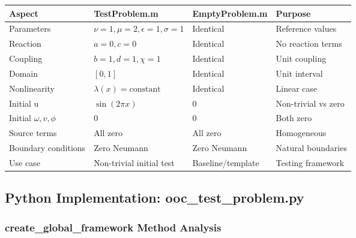 \begin{longtable}{|p{3cm}|p{4cm}|p{4cm}|p{2cm}|}
\hline
\textbf{Aspect} & \textbf{TestProblem.m} & \textbf{EmptyProblem.m} & \textbf{Purpose} \\
\hline
\endhead

Parameters & $\nu=1, \mu=2, \epsilon=1, \sigma=1$ & Identical & Reference values \\
\hline

Reaction & $a=0, c=0$ & Identical & No reaction terms \\
\hline

Coupling & $b=1, d=1, \chi=1$ & Identical & Unit coupling \\
\hline

Domain & $[0, 1]$ & Identical & Unit interval \\
\hline

Nonlinearity & $\lambda(x) = \text{constant}$ & Identical & Linear case \\
\hline

Initial u & $\sin(2\pi x)$ & $0$ & Non-trivial vs zero \\
\hline

Initial $\omega,v,\phi$ & $0$ & $0$ & Both zero \\
\hline

Source terms & All zero & All zero & Homogeneous \\
\hline

Boundary conditions & Zero Neumann & Zero Neumann & Natural boundaries \\
\hline

Use case & Non-trivial initial test & Baseline/template & Testing framework \\
\hline

\end{longtable}

\subsection{Python Implementation: ooc\_test\_problem.py}
\label{subsec:python_ooc_implementation}

\subsubsection{create\_global\_framework Method Analysis}

